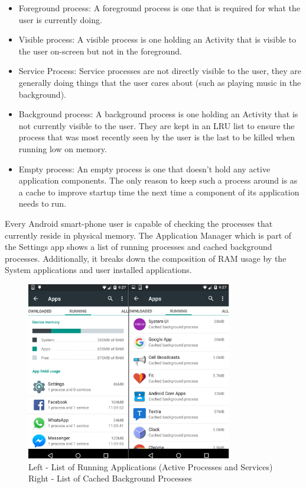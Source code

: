 \documentclass[12pt]{uthesis-v12}  %
\begin{document}
			\begin{itemize}
				\item Foreground process: A foreground process is one that is required for what the user is currently doing.
				
				\item Visible process: A visible process is one holding an Activity that is visible to the user on-screen but not in the foreground.
				
				\item Service Process: Service processes are not directly visible to the user, they are generally doing things that the user cares about (such as playing music in the background). 
				
				\item Background process: A background process is one holding an Activity that is not currently visible to the user. They are kept in an LRU list to ensure the process that was most recently seen by the user is the last to be killed when running low on memory.  
				
				\item Empty process: An empty process is one that doesn't hold any active application components. The only reason to keep such a process around is as a cache to improve startup time the next time a component of its application needs to run.				
			\end{itemize}
			
			Every Android smart-phone user is capable of checking the processes that currently reside in physical memory. The Application Manager which is part of the Settings app shows a list of running processes and cached background processes. Additionally, it breaks down the composition of RAM usage by the System applications and user installed applications. 
			
			\begin{figure}[h]
				\centering
				\includegraphics[width = 90mm]{images/runningApps.png}
				\caption[Running Apps and Cached Background Processes]
				{Left - List of Running Applications (Active Processes and Services)\\
					Right - List of Cached Background Processes}
			\end{figure}			
			 
\end{document}
